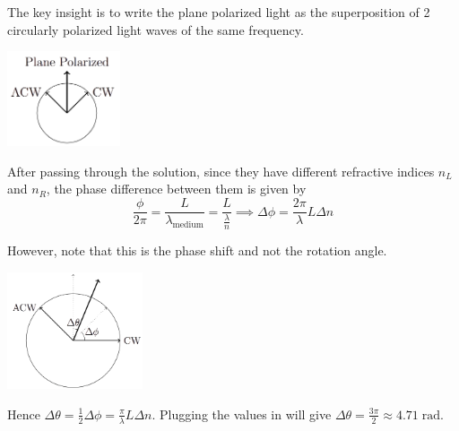 \begin{solution}

The key insight is to write the plane polarized light as the superposition of 2 circularly polarized light waves of the same frequency. 
\begin{center}
    \includegraphics[width=0.25\textwidth]{solutions/figures/polarization-decomposition.png}
\end{center}
    
After passing through the solution, since they have different refractive indices $n_L$ and $n_R$, the phase difference between them is given by
$$\frac{\phi}{2\pi} = \frac{L}{\lambda_{\text{medium}}} = \frac{L}{\frac{\lambda}{n}} \implies \Delta \phi = \frac{2\pi}{\lambda}L\Delta n$$
    
However, note that this is the phase shift and not the rotation angle.

\begin{center}
    \includegraphics[width=0.3\textwidth]{solutions/figures/rotation-shift.png}
\end{center}
    
Hence $\Delta \theta = \frac{1}{2}\Delta \phi = \frac{\pi}{\lambda} L \Delta n$. Plugging the values in will give $\boxed{\Delta \theta = \frac{3\pi}{2} \approx 4.71\;\mathrm{rad}}$.

\end{solution}